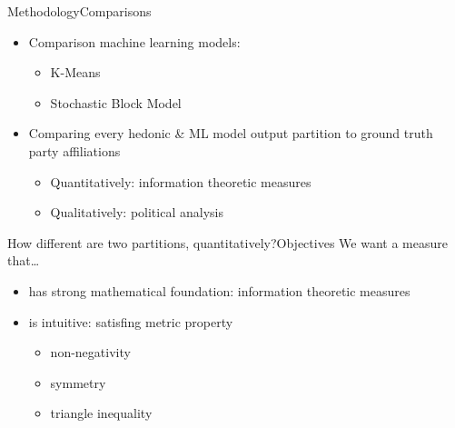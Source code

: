 \documentclass[xcolor=dvipsnames]{beamer}
\begin{document}
\begin{frame}{Methodology}{Comparisons}
  \begin{itemize}
    \item Comparison machine learning models:
    \begin{itemize}
      \item K-Means
      \item Stochastic Block Model
    \end{itemize}
    \item Comparing every hedonic \& ML model output partition to ground truth party affiliations
    \begin{itemize}
      \item Quantitatively: information theoretic measures
      \item Qualitatively: political analysis
    \end{itemize}
  \end{itemize}
\end{frame}

\begin{frame}{How different are two partitions, quantitatively?}{Objectives}
  We want a measure that\ldots
  \begin{itemize}
    \item has strong mathematical foundation: information theoretic measures
    \item is intuitive: satisfing metric property
    \begin{itemize}
      \item non-negativity
      \item symmetry
      \item triangle inequality
    \end{itemize}
  \end{itemize}
\end{frame}
\end{document}
